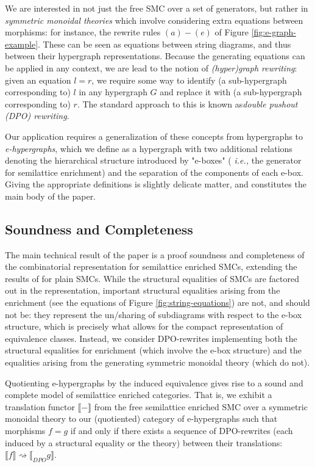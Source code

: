 We are interested in not just the free SMC over a set of generators, but rather in \textit{symmetric monoidal theories} which involve considering extra equations between morphisms: for instance, the rewrite rules $(a)-(e)$ of Figure \ref{fig:e-graph-example}. These can be seen as equations between string diagrams, and thus between their hypergraph representations.  Because the generating equations can be applied in any context, we are lead to the notion of \textit{(hyper)graph rewriting}: given an equation $l=r$, we require some way to identify (a sub-hypergraph corresponding to) $l$ in any hypergraph $G$ and replace it with (a sub-hypergraph corresponding to) $r$.
The standard approach to this is known as\textit{double pushout (DPO) rewriting}. 

Our application requires a generalization of these concepts from hypergraphs to \textit{e-hypergraphs}, which we define as a hypergraph with two additional relations denoting the hierarchical structure introduced by "e-boxes" ( \textit{i.e.,} the generator for semilattice enrichment) and the separation of the components of each e-box.
Giving the appropriate definitions is slightly delicate matter, and constitutes the main body of the paper. 

\subsection*{Soundness and Completeness}
The main technical result of the paper is a proof soundness and completeness of the combinatorial representation for semilattice enriched SMCs, extending the results of \cite{bonchi_string_2022-2} for plain SMCs. While the structural equalities of SMCs are factored out in the representation,  important structural equalities arising from the enrichment (see the equations of Figure \ref{fig:string-equations}) are not, and should not be: they represent the un/sharing of subdiagrams with respect to the e-box structure,  which is precisely what allows for the compact representation of equivalence classes.  Instead, we consider DPO-rewrites implementing both the structural equalities for enrichment (which involve the e-box structure) and the equalities arising from the generating symmetric monoidal theory (which do not).  

Quotienting e-hypergraphs by the induced equivalence gives rise to a sound and complete model of semilattice enriched categories.  That is, we exhibit a translation functor $\llbracket-\rrbracket$ from the free semilattice enriched SMC over a symmetric monoidal theory to our (quotiented) category of e-hypergraphs such that 
morphisms $f = g$ if and only if there exists a sequence of DPO-rewrites (each induced by a structural equality or the theory) between their translations: $\llbracket f \rrbracket \rightsquigarrow \llbracket_{DPO} g \rrbracket$. 

